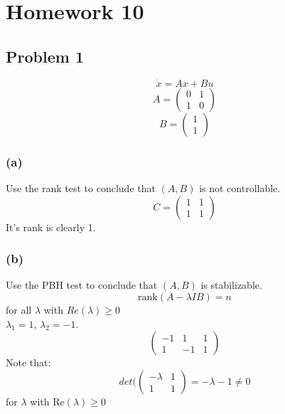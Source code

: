 \documentclass{article}
\begin{document}
\section*{Homework 10}
\subsection*{Problem 1}
\[\dot{x}=Ax+Bu\]
\[A=\begin{pmatrix}0&1\\1&0\end{pmatrix}\]
\[B=\begin{pmatrix}1\\1\end{pmatrix}\]
\subsubsection*{(a)}
Use the rank test to conclude that $(A,B)$ is not controllable.\\
\[C=\begin{pmatrix}1&1\\1&1\end{pmatrix}\]
It's rank is clearly 1.\\
\subsubsection*{(b)}
Use the PBH test to conclude that $(A,B)$ is stabilizable.
\[\text{rank}(A-\lambda I B)=n\]
for all $\lambda$ with $Re(\lambda)\geq 0$\\
$\lambda_1=1$, $\lambda_2=-1$.\\
\[\begin{pmatrix}-1&1&1\\1&-1&1\end{pmatrix}\]
Note that: 
\[det(\begin{pmatrix}-\lambda & 1\\1&1\end{pmatrix}=-\lambda-1\neq 0\]
for $\lambda$ with Re$(\lambda)\geq 0$
\end{document}
